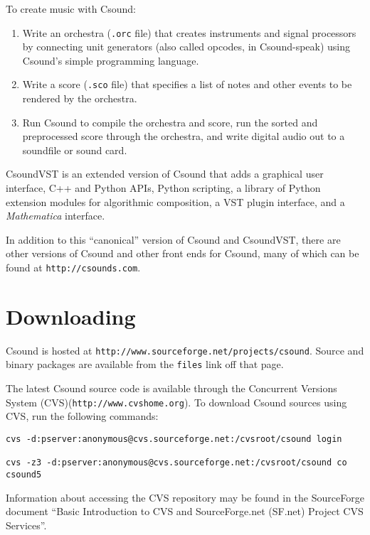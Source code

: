 \documentclass[10pt,letterpaper,onecolumn]{ltxguide}
\begin{document}
To create music with Csound:

\begin{enumerate}
\item Write an orchestra (\texttt{.orc} file) that creates instruments and signal processors by connecting unit generators (also called opcodes, in Csound-speak) using Csound's simple programming language.
\item Write a score (\texttt{.sco} file) that specifies a list of notes and other events to be rendered by the orchestra.
\item Run Csound to compile the orchestra and score, run the sorted and preprocessed score through the orchestra, and write digital audio out to a soundfile or sound card.
\end{enumerate}

CsoundVST is an extended version of Csound that adds a graphical user interface, C++ and Python APIs, Python scripting, a library of Python extension modules for algorithmic composition, a VST plugin interface, and a \emph{Mathematica} interface.

In addition to this ``canonical'' version of Csound and CsoundVST, there are other versions of Csound and other front ends for Csound, many of which can be found at \texttt{http://csounds.com}.

\section{Downloading}

Csound is hosted at \texttt{http:\-//www.sourceforge.net/projects/\-csound}. \linebreak Source and binary packages are available from the \texttt{files} link off that page.

The latest Csound source code is available through the Concurrent Versions System (CVS)(\texttt{http:\-//www.cvshome.org}). To download Csound sources using CVS, run the following commands:

\begin{verbatim}
cvs -d:pserver:anonymous@cvs.sourceforge.net:/cvsroot/csound login 
 
cvs -z3 -d:pserver:anonymous@cvs.sourceforge.net:/cvsroot/csound co csound5 
\end{verbatim}

Information about accessing the CVS repository may be found in the SourceForge document ``Basic Introduction to CVS and SourceForge.net (SF.net) Project CVS Services''. 
\end{document}

